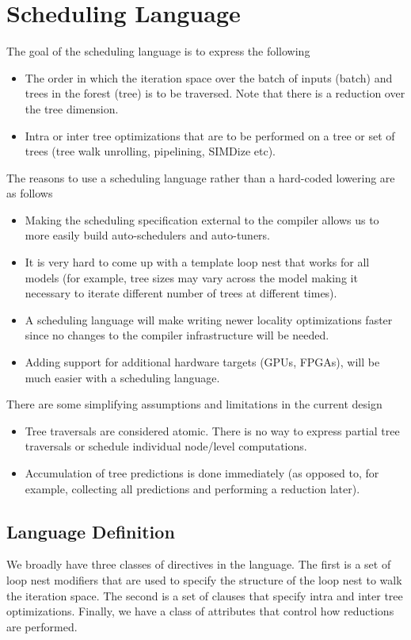 \section{Scheduling Language}
\label{sec:schedule}
The goal of the scheduling language is to express the following
\begin{itemize}
  \item The order in which the iteration space over the batch of inputs (batch) and trees in the forest (tree) is to be traversed. Note that there is a reduction over the tree dimension.
  \item Intra or inter tree optimizations that are to be performed on a tree or set of trees (tree walk unrolling, pipelining, SIMDize etc).
\end{itemize}

The reasons to use a scheduling language rather than a hard-coded lowering are as follows
\begin{itemize}
  \item Making the scheduling specification external to the compiler allows us to 
  more easily build auto-schedulers and auto-tuners.
  \item It is very hard to come up with a template loop nest that works for all models 
  (for example, tree sizes may vary across the model making it necessary to iterate 
  different number of trees at different times).
  \item A scheduling language will make writing newer locality optimizations faster since 
  no changes to the compiler infrastructure will be needed.
  \item Adding support for additional hardware targets (GPUs, FPGAs), will be much easier
  with a scheduling language.
\end{itemize}

There are some simplifying assumptions and limitations in the current design
\begin{itemize}
  \item Tree traversals are considered atomic. There is no way to express partial
   tree traversals or schedule individual node/level computations. 
  \item Accumulation of tree predictions is done immediately (as opposed to, 
  for example, collecting all predictions and performing a reduction later).
\end{itemize}

\subsection{Language Definition}
We broadly have three classes of directives in the language. The first is a set 
of loop nest modifiers that are used to specify the structure of the loop nest to
walk the iteration space. The second is a set of clauses that specify intra and 
inter tree optimizations. Finally, we have a class of attributes that control how 
reductions are performed.

